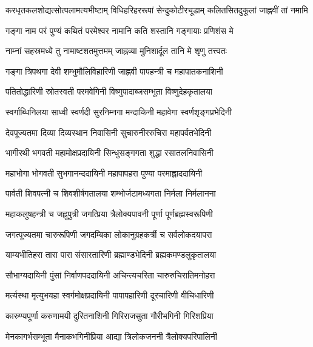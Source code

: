 
{करधृतकलशोद्यत्सोत्पलामत्यभीष्टाम्}
{विधिहरिहररूपां सेन्दुकोटीरचूडाम्}
{कलितसितदुकूलां जाह्नवीं तां नमामि}


\twolineshloka
{गङ्गा नाम परं पुण्यं कथितं परमेश्वर}
{नामानि कति शस्तानि गङ्गायाः प्रणिशंस मे}

\twolineshloka
{नाम्नां सहस्रमध्ये तु नामाष्टशतमुत्तमम्}
{जाह्नव्या मुनिशार्दूल तानि मे शृणु तत्त्वतः}

\twolineshloka
{गङ्गा त्रिपथगा देवी शम्भुमौलिविहारिणी}
{जाह्नवी पापहन्त्री च महापातकनाशिनी}

\twolineshloka
{पतितोद्धारिणी स्रोतस्वती परमवेगिनी}
{विष्णुपादाब्जसम्भूता विष्णुदेहकृतालया}

\twolineshloka
{स्वर्गाब्धिनिलया साध्वी स्वर्णदी सुरनिम्नगा}
{मन्दाकिनी महावेगा स्वर्णशृङ्गप्रभेदिनी}

\twolineshloka
{देवपूज्यतमा दिव्या दिव्यस्थान निवासिनी}
{सुचारुनीररुचिरा महापर्वतभेदिनी}

\twolineshloka
{भागीरथी भगवती महामोक्षप्रदायिनी}
{सिन्धुसङ्गगता शुद्धा रसातलनिवासिनी}

\twolineshloka
{महाभोगा भोगवती सुभगानन्ददायिनी}
{महापापहरा पुण्या परमाह्लाददायिनी}

\twolineshloka
{पार्वती शिवपत्नी च शिवशीर्षगतालया}
{शम्भोर्जटामध्यगता निर्मला निर्मलानना}

\twolineshloka
{महाकलुषहन्त्री च जह्नुपुत्री जगत्प्रिया}
{त्रैलोक्यपावनी पूर्णा पूर्णब्रह्मस्वरूपिणी}

\twolineshloka
{जगत्पूज्यतमा चारुरूपिणी जगदम्बिका}
{लोकानुग्रहकर्त्री च सर्वलोकदयापरा}

\twolineshloka
{याम्यभीतिहरा तारा पारा संसारतारिणी}
{ब्रह्माण्डभेदिनी ब्रह्मकमण्डलुकृतालया}

\twolineshloka
{सौभाग्यदायिनी पुंसां निर्वाणपददायिनी}
{अचिन्त्यचरिता चारुरुचिरातिमनोहरा}

\twolineshloka
{मर्त्यस्था मृत्युभयहा स्वर्गमोक्षप्रदायिनी}
{पापापहारिणी दूरचारिणी वीचिधारिणी}

\twolineshloka
{कारुण्यपूर्णा करुणामयी दुरितनाशिनी}
{गिरिराजसुता गौरीभगिनी गिरिशप्रिया}

\twolineshloka
{मेनकागर्भसम्भूता मैनाकभगिनीप्रिया}
{आद्या त्रिलोकजननी त्रैलोक्यपरिपालिनी}

